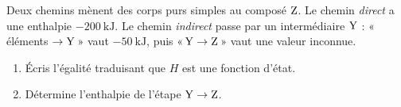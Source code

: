 \documentclass[11pt,a4paper]{article}
\begin{document}
\begin{exo}
Deux chemins mènent des corps purs simples au composé $\ce{Z}$. Le chemin \emph{direct} a une enthalpie $\qty{-200}{\kilo\joule}$. Le chemin \emph{indirect} passe par un intermédiaire $\ce{Y}$ : «\,éléments $\rightarrow \ce{Y}$\,» vaut $\qty{-50}{\kilo\joule}$, puis «\,$\ce{Y} \rightarrow \ce{Z}$\,» vaut une valeur inconnue.
\begin{enumerate}[label=\alph*)]
  \item Écris l'égalité traduisant que $H$ est une fonction d'état.
  \item Détermine l'enthalpie de l'étape $\ce{Y} \rightarrow \ce{Z}$.
\end{enumerate}
\end{exo}
\end{document}
